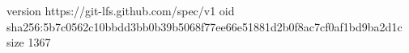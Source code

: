 version https://git-lfs.github.com/spec/v1
oid sha256:5b7c0562c10bbdd3bb0b39b5068f77ee66e51881d2b0f8ac7cf0af1bd9ba2d1c
size 1367
